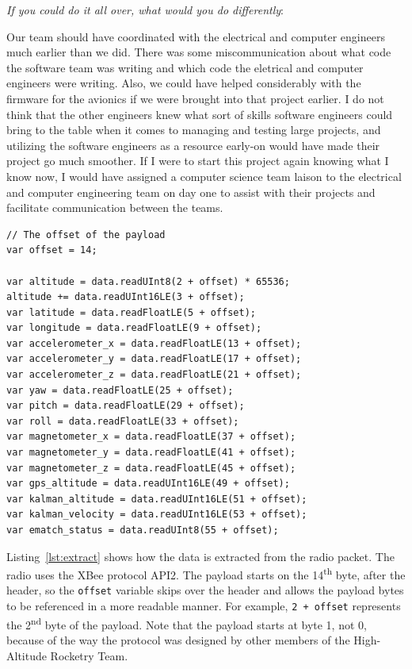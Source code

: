 \documentclass[10pt,draftclsnofoot,onecolumn]{IEEEtran}
\newcommand{\subsubsubsection}[1]{
	\hfill\break\textit{#1}:
}
\begin{document}
\subsubsubsection{If you could do it all over, what would you do differently}
Our team should have coordinated with the electrical and computer engineers much earlier than we did.
There was some miscommunication about what code the software team was writing and which code the eletrical and computer engineers were writing.
Also, we could have helped considerably with the firmware for the avionics if we were brought into that project earlier.
I do not think that the other engineers knew what sort of skills software engineers could bring to the table when it comes to managing and testing large projects,
and utilizing the software engineers as a resource early-on would have made their project go much smoother.
If I were to start this project again knowing what I know now, I would have assigned a computer science team laison to the electrical and computer engineering team on day one
to assist with their projects and facilitate communication between the teams.

















\newpage
{}

\begin{lstlisting}[caption={Telemetry payload data extraction},label={lst:extract}]
// The offset of the payload
var offset = 14;

var altitude = data.readUInt8(2 + offset) * 65536;
altitude += data.readUInt16LE(3 + offset);
var latitude = data.readFloatLE(5 + offset);
var longitude = data.readFloatLE(9 + offset);
var accelerometer_x = data.readFloatLE(13 + offset);
var accelerometer_y = data.readFloatLE(17 + offset);
var accelerometer_z = data.readFloatLE(21 + offset);
var yaw = data.readFloatLE(25 + offset);
var pitch = data.readFloatLE(29 + offset);
var roll = data.readFloatLE(33 + offset);
var magnetometer_x = data.readFloatLE(37 + offset);
var magnetometer_y = data.readFloatLE(41 + offset);
var magnetometer_z = data.readFloatLE(45 + offset);
var gps_altitude = data.readUInt16LE(49 + offset);
var kalman_altitude = data.readUInt16LE(51 + offset);
var kalman_velocity = data.readUInt16LE(53 + offset);
var ematch_status = data.readUInt8(55 + offset);
\end{lstlisting}

Listing~\ref{lst:extract} shows how the data is extracted from the radio packet.
The radio uses the XBee protocol API2.
The payload starts on the 14\textsuperscript{th} byte, after the header, so the \texttt{offset} variable skips
over the header and allows the payload bytes to be referenced in a more readable manner.
For example, \texttt{2 + offset} represents the 2\textsuperscript{nd} byte of the payload.
Note that the payload starts at byte 1, not 0, because of the way the protocol was designed by other members of the High-Altitude Rocketry Team.
\end{document}
